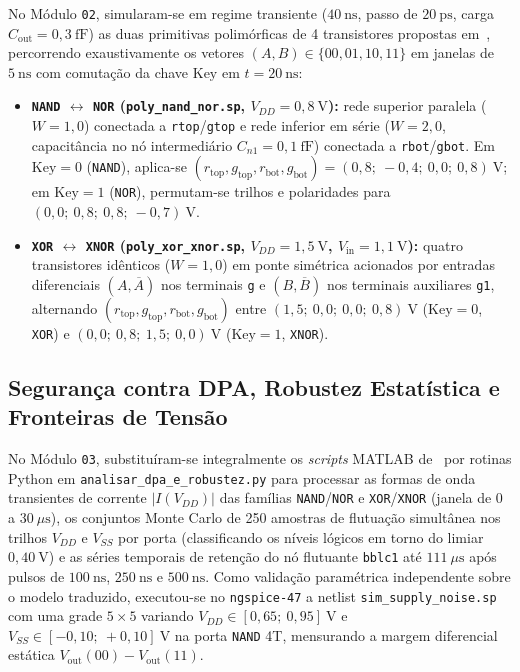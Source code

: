 No M\'{o}dulo \texttt{02}, simularam-se em regime transiente ($40\ \text{ns}$, passo de $20\ \text{ps}$, carga $C_{\mathrm{out}} = 0{,}3\ \text{fF}$) as duas primitivas polim\'{o}rficas de 4 transistores propostas em~\cite{wu2020reconfigurable}, percorrendo exaustivamente os vetores $(A,B) \in \{00, 01, 10, 11\}$ em janelas de $5\ \text{ns}$ com comuta\c{c}\~{a}o da chave $\text{Key}$ em $t = 20\ \text{ns}$:
\begin{itemize}
    \item \textbf{\texttt{NAND} $\leftrightarrow$ \texttt{NOR} (\texttt{poly\_nand\_nor.sp}, $V_{DD} = 0{,}8\ \text{V}$):} rede superior paralela ($W=1{,}0$) conectada a \texttt{rtop}/\texttt{gtop} e rede inferior em s\'{e}rie ($W=2{,}0$, capacit\^{a}ncia no n\'{o} intermedi\'{a}rio $C_{n1}=0{,}1\ \text{fF}$) conectada a \texttt{rbot}/\texttt{gbot}. Em $\text{Key}=0$ (\texttt{NAND}), aplica-se $(r_{\mathrm{top}}, g_{\mathrm{top}}, r_{\mathrm{bot}}, g_{\mathrm{bot}}) = (0{,}8;\ -0{,}4;\ 0{,}0;\ 0{,}8)\ \text{V}$; em $\text{Key}=1$ (\texttt{NOR}), permutam-se trilhos e polaridades para $(0{,}0;\ 0{,}8;\ 0{,}8;\ -0{,}7)\ \text{V}$.
    \item \textbf{\texttt{XOR} $\leftrightarrow$ \texttt{XNOR} (\texttt{poly\_xor\_xnor.sp}, $V_{DD} = 1{,}5\ \text{V}$, $V_{\mathrm{in}} = 1{,}1\ \text{V}$):} quatro transistores id\^{e}nticos ($W=1{,}0$) em ponte sim\'{e}trica acionados por entradas diferenciais $(A,\overline{A})$ nos terminais \texttt{g} e $(B,\overline{B})$ nos terminais auxiliares \texttt{g1}, alternando $(r_{\mathrm{top}}, g_{\mathrm{top}}, r_{\mathrm{bot}}, g_{\mathrm{bot}})$ entre $(1{,}5;\ 0{,}0;\ 0{,}0;\ 0{,}8)\ \text{V}$ ($\text{Key}=0$, \texttt{XOR}) e $(0{,}0;\ 0{,}8;\ 1{,}5;\ 0{,}0)\ \text{V}$ ($\text{Key}=1$, \texttt{XNOR}).
\end{itemize}

\subsection{Seguran\c{c}a contra DPA, Robustez Estat\'{i}stica e Fronteiras de Tens\~{a}o}\label{sec:met_dpa_fronteira}

No M\'{o}dulo \texttt{03}, substitu\'{i}ram-se integralmente os \textit{scripts} MATLAB de~\cite{wu2020reconfigurable} por rotinas Python em \texttt{analisar\_dpa\_e\_robustez.py} para processar as formas de onda transientes de corrente $|I(V_{DD})|$ das fam\'{i}lias \texttt{NAND}/\texttt{NOR} e \texttt{XOR}/\texttt{XNOR} (janela de $0$ a $30\ \mu\text{s}$), os conjuntos Monte Carlo de 250 amostras de flutua\c{c}\~{a}o simult\^{a}nea nos trilhos $V_{DD}$ e $V_{SS}$ por porta (classificando os n\'{i}veis l\'{o}gicos em torno do limiar $0{,}40\ \text{V}$) e as s\'{e}ries temporais de reten\c{c}\~{a}o do n\'{o} flutuante \texttt{bblc1} at\'{e} $111\ \mu\text{s}$ ap\'{o}s pulsos de $100\ \text{ns}$, $250\ \text{ns}$ e $500\ \text{ns}$. Como valida\c{c}\~{a}o param\'{e}trica independente sobre o modelo traduzido, executou-se no \texttt{ngspice-47} a netlist \texttt{sim\_supply\_noise.sp} com uma grade $5 \times 5$ variando $V_{DD} \in [0{,}65;\ 0{,}95]\ \text{V}$ e $V_{SS} \in [-0{,}10;\ +0{,}10]\ \text{V}$ na porta \texttt{NAND} 4T, mensurando a margem diferencial est\'{a}tica $V_{\mathrm{out}}(00) - V_{\mathrm{out}}(11)$.

